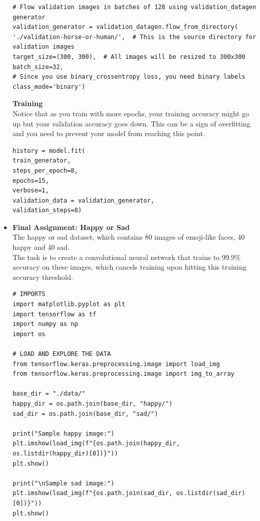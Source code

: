 \documentclass[20pt]{article}
\begin{document}
\begin{itemize}
\begin{verbatim}
# Flow validation images in batches of 128 using validation_datagen generator
validation_generator = validation_datagen.flow_from_directory(
'./validation-horse-or-human/',  # This is the source directory for validation images
target_size=(300, 300),  # All images will be resized to 300x300
batch_size=32,
# Since you use binary_crossentropy loss, you need binary labels
class_mode='binary')
		\end{verbatim}
		\textbf{Training}\\
		Notice that as you train with more epochs, your training accuracy might go up but your validation accuracy goes down. This can be a sign of overfitting and you need to prevent your model from reaching this point.
		\begin{verbatim}
history = model.fit(
train_generator,
steps_per_epoch=8,  
epochs=15,
verbose=1,
validation_data = validation_generator,
validation_steps=8)
		\end{verbatim}
	\item \textbf{Final Assignment: Happy or Sad}\\
	The happy or sad dataset, which contains 80 images of emoji-like faces, 40 happy and 40 sad.\\
	The task is to create a convolutional neural network that trains to 99.9\% accuracy on these images, which cancels training upon hitting this training accuracy threshold.
	\begin{verbatim}
# IMPORTS
import matplotlib.pyplot as plt
import tensorflow as tf
import numpy as np
import os

# LOAD AND EXPLORE THE DATA
from tensorflow.keras.preprocessing.image import load_img
from tensorflow.keras.preprocessing.image import img_to_array

base_dir = "./data/"
happy_dir = os.path.join(base_dir, "happy/")
sad_dir = os.path.join(base_dir, "sad/")

print("Sample happy image:")
plt.imshow(load_img(f"{os.path.join(happy_dir, os.listdir(happy_dir)[0])}"))
plt.show()

print("\nSample sad image:")
plt.imshow(load_img(f"{os.path.join(sad_dir, os.listdir(sad_dir)[0])}"))
plt.show()


\end{verbatim}
\end{itemize}
\end{document}
